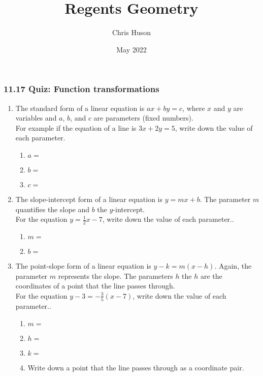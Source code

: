 \documentclass[12pt, twoside]{article}
\title{Regents Geometry}
\author{Chris Huson}
\date{May 2022}
\begin{document}
\subsubsection*{11.17 Quiz: Function transformations}
\begin{enumerate}
\item The standard form of a linear equation is $ax+by=c$, where $x$ and $y$ are variables and $a$, $b$, and $c$ are parameters (fixed numbers).\\[0.25cm]
For example if the equation of a line is $3x+2y=5$, write down the value of each parameter.
  \begin{enumerate}
    \item $a=$
    \vspace{0.5cm}
    \item $b=$
    \vspace{0.5cm}
    \item $c=$
  \end{enumerate} \vspace{0.2cm}

\item The slope-intercept form of a linear equation is $y=mx+b$. The parameter $m$ quantifies the slope and $b$ the $y$-intercept.\\[0.25cm]
For the equation $y=\frac{1}{2}x-7$, write down the value of each parameter..
  \begin{enumerate}
    \item $m=$
    \vspace{0.5cm}
    \item $b=$
    \vspace{0.2cm}
  \end{enumerate}

\item The point-slope form of a linear equation is $y-k=m(x-h)$. Again, the parameter $m$ represents the slope. The parameters $h$ the $h$ are the coordinates of a point that the line passes through.\\[0.25cm]
For the equation $y-3=-\frac{3}{5}(x-7)$, write down the value of each parameter..
  \begin{enumerate}
    \item $m=$
    \vspace{0.5cm}
    \item $h=$
    \vspace{0.5cm}
    \item $k=$
    \vspace{0.5cm}
    \item Write down a point that the line passes through as a coordinate pair.
  \end{enumerate}
  

\end{enumerate}
\end{document}
